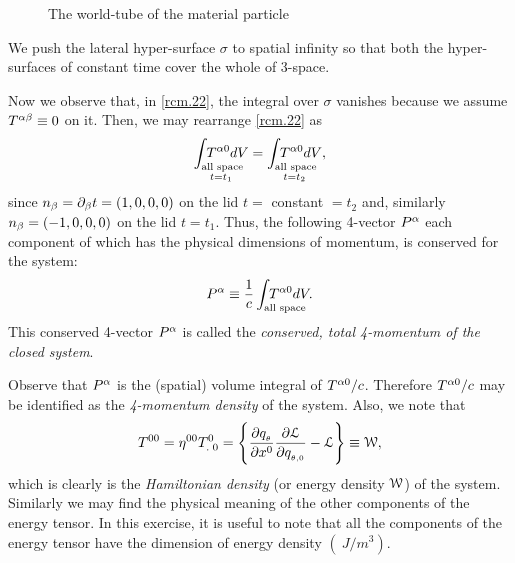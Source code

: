 \begin{figure}[H]
\begin{center}
\end{center}
\caption{The world-tube of the material 
particle}\label{fig9.2}
\end{figure}
We push the lateral hyper-surface $\sigma$ to spatial 
infinity so that both the hyper-surfaces of constant time 
cover the whole of 3-space.

Now we observe that, in \eqref{rcm.22},  the  integral over 
$\sigma$ vanishes because  we assume $T^{{\alpha}{\beta}}\equiv 0$ 
on it. Then, we may rearrange \eqref{rcm.22}  as
\begin{align}\label{rcm.23}
\underset{t=t_1}{\int_{\text{all space}
\hspace{5mm}} \hspace{-15mm} T^{\gka0}dV} =
\underset{t=t_2}{\int_{\text{all
space} \hspace{5mm}}\hspace{-15mm}T^{\gka0}dV},
\end{align}
since $n_{{\beta}} ={\partial}_{{\beta}} t = (1,0,0,0)$ on the lid $t=$ 
constant $=t_2$ and, similarly $n_{{\beta}} =(-1,0,0,0) $ on the 
lid $t=t_1$. Thus, the following 4-vector $P^{{\alpha}}$ each 
component of which has the physical dimensions of momentum, 
is  {conserved} for the system: 
\begin{align}\label{rcm.24}
P^\gka\equiv  \frac{1}{c}\int_{\text{all space}}
\hspace{-10mm} T^{\gka0}dV.
\end{align}
This conserved 4-vector $P^{{\alpha}}$ is called the 
\textsl{conserved, total  4-momen\break tum of the {closed} 
system}.

 Observe that $P^{{\alpha}}$ is  the (spatial) 
volume integral of $T^{{\alpha}0}/c$. Therefore $T^{{\alpha}0}/c$ 
may be identified as the \textsl{4-momentum density} of the 
system. Also, we note that
\begin{align}\label{rcm.25}
T^{00} =\eta^{00}{{T}^{0}_{.\;0}}=\left\lbrace \frac{{\partial}
q_{_{{\theta}}}  }{{\partial} x^0} \frac{{\partial} \EuScript{L}}{{\partial}
q_{_{{\theta},{0}}}} - \EuScript{L}\right\rbrace \equiv\EuScript{W},
\end{align}
which is clearly is the  \textsl{Hamiltonian density} (or 
energy density $\EuScript{W}$) of the system. Similarly we 
may find the  physical meaning of  the other components 
of the energy tensor. In this exercise, it is useful to 
note that all the components of the energy tensor have the 
dimension of energy density $(\SI{}{J/m^3})$.


